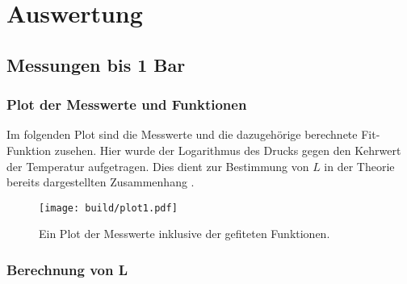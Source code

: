 \clearpage
\section{Auswertung}

\subsection{Messungen bis 1 Bar}

\subsubsection{Plot der Messwerte und Funktionen}
Im folgenden Plot sind die Messwerte und die dazugehörige berechnete Fit-Funktion  zusehen.
Hier wurde der Logarithmus des Drucks gegen den Kehrwert der Temperatur aufgetragen.
Dies dient zur Bestimmung von $L$ in der Theorie 
bereits dargestellten Zusammenhang .
\begin{figure}[htp]
    \centering
    \texttt{[image: build/plot1.pdf]}
    \caption{Ein Plot der Messwerte inklusive der gefiteten Funktionen.}
    \label{img:plot1}
\end{figure}
\FloatBarrier


\subsubsection{Berechnung von L}

